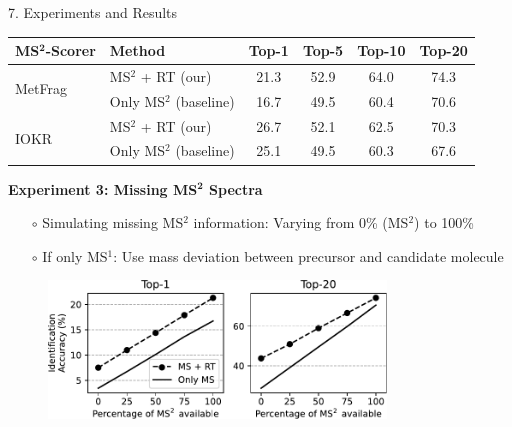 \documentclass{beamer}
\newcommand{\ms}{MS}
\newcommand{\msone}{\ms$^1$}
\newcommand{\msms}{\ms$^2$}
\begin{document}
\begin{frame}{}
\begin{columns}[T]
\begin{block}{{\normalsize 7. Experiments and Results}}
\begin{itemize}
    \end{itemize}
        \begin{table}
            \centering
            \begin{tabular}{llcccc}
                \toprule
                {\bf \ms$^\mathbf{2}$-Scorer} & {\bf Method} & {\bf Top-1} & {\bf Top-5} & {\bf Top-10} & {\bf Top-20} \\ 
                \midrule
                    \multirow{2}{*}{MetFrag} &  \msms{} + RT (our) &   21.3 &   52.9 &    64.0 &    74.3 \\
                                             &  Only \msms{} (baseline) &   16.7 &   49.5 &    60.4 &    70.6 \\
                    \cmidrule(lr){1-6}
                    \multirow{2}{*}{IOKR} &  \msms{} + RT (our) &   26.7 &   52.1 &    62.5 &    70.3 \\
                                          &  Only \msms{} (baseline)&   25.1 &   49.5 &    60.3 &    67.6 \\
                \bottomrule
            \end{tabular}
        \end{table}
    \vspace{1cm}
    \textbf{Experiment 3: Missing \ms$^\mathbf{2}$ Spectra}
    \begin{itemize}
        \item[$\circ$] Simulating missing \msms{} information: Varying from 0\% (\msms) to 100\%
        \item[$\circ$] If only \msone{}: Use mass deviation between precursor and candidate molecule
    \end{itemize}
    \begin{figure}
        \centering
        \includegraphics[width=0.8\textwidth]{images/missing_ms2.pdf}
    \end{figure}
    \vspace{-0.75cm}
    \end{block}




\vfill


\end{columns}
\end{frame}
\end{document}
